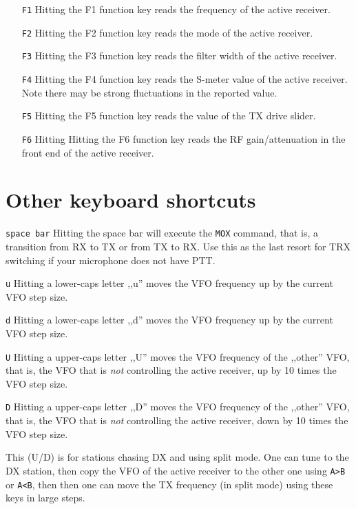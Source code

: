 \documentclass[12pt]{book}
\def\rett#1{\texttt{\color{red}#1}}
\def\bltt#1{\texttt{\color{blue}#1}}
\begin{document}
\begin{itemize}
\item[\rett{F1}]{Hitting the F1 function key reads the frequency of the active receiver.}

\item[\rett{F2}]{Hitting the F2 function key reads the mode of the active receiver.}

\item[\rett{F3}]{Hitting the F3 function key reads the filter width of the active receiver.}

\item[\rett{F4}]{Hitting the F4 function key reads the S-meter value of the active receiver.
Note there may be strong fluctuations in the reported value.}

\item[\rett{F5}]{Hitting the F5 function key reads the value of the TX drive slider.}

\item[\rett{F6}]{Hitting Hitting the F6 function key reads the RF gain/attenuation in the front
end of the active receiver.}
\end{itemize}

\section{Other keyboard shortcuts}

\rett{space bar} Hitting the space bar will execute the \bltt{MOX} command, that is, a
transition from RX to TX or from TX to RX. Use this as the last resort for TRX switching
if your microphone does not have PTT.

\rett{u} Hitting a lower-caps letter ,,u'' moves the VFO frequency up by the current VFO
step size.

\rett{d} Hitting a lower-caps letter ,,d'' moves the VFO frequency up by the current VFO
step size.

\rett{U} Hitting a upper-caps letter ,,U'' moves the VFO frequency of the ,,other'' VFO, that is,
the VFO that is \textit{not} controlling the active receiver, up by 10 times the VFO step size.

\rett{D} Hitting a upper-caps letter ,,D'' moves the VFO frequency of the ,,other'' VFO, that is,
the VFO that is \textit{not} controlling the active receiver, down by 10 times the VFO step size.

This (U/D) is for stations chasing DX and using split mode. One can tune to the DX station,
then copy the VFO of the active receiver to the other one using \bltt{A>B} or \bltt{A<B}, then then
one can  move the TX frequency (in split mode) using these keys in large steps.
\end{document}
